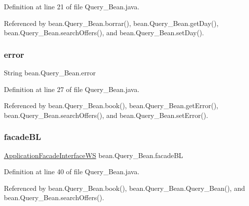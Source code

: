 Definition at line 21 of file Query\+\_\+\+Bean.\+java.



Referenced by bean.\+Query\+\_\+\+Bean.\+borrar(), bean.\+Query\+\_\+\+Bean.\+get\+Day(), bean.\+Query\+\_\+\+Bean.\+search\+Offers(), and bean.\+Query\+\_\+\+Bean.\+set\+Day().

\mbox{\label{classbean_1_1Query__Bean_a41a8d631f015a0b8df5a9b40f5cc3231}} 
\subsubsection{\texorpdfstring{error}{error}}
{\footnotesize\ttfamily String bean.\+Query\+\_\+\+Bean.\+error\hspace{0.3cm}{\ttfamily [package]}}



Definition at line 27 of file Query\+\_\+\+Bean.\+java.



Referenced by bean.\+Query\+\_\+\+Bean.\+book(), bean.\+Query\+\_\+\+Bean.\+get\+Error(), bean.\+Query\+\_\+\+Bean.\+search\+Offers(), and bean.\+Query\+\_\+\+Bean.\+set\+Error().

\mbox{\label{classbean_1_1Query__Bean_a8809176658727a8daec87ba0b2dda2de}} 
\subsubsection{\texorpdfstring{facadeBL}{facadeBL}}
{\footnotesize\ttfamily \mbox{\hyperlink{interfacebusinessLogic_1_1ApplicationFacadeInterfaceWS}{Application\+Facade\+Interface\+WS}} bean.\+Query\+\_\+\+Bean.\+facade\+BL\hspace{0.3cm}{\ttfamily [static]}}



Definition at line 40 of file Query\+\_\+\+Bean.\+java.



Referenced by bean.\+Query\+\_\+\+Bean.\+book(), bean.\+Query\+\_\+\+Bean.\+Query\+\_\+\+Bean(), and bean.\+Query\+\_\+\+Bean.\+search\+Offers().

\mbox{\label{classbean_1_1Query__Bean_af1040de2275895452b9e60535b4983b6}} 
